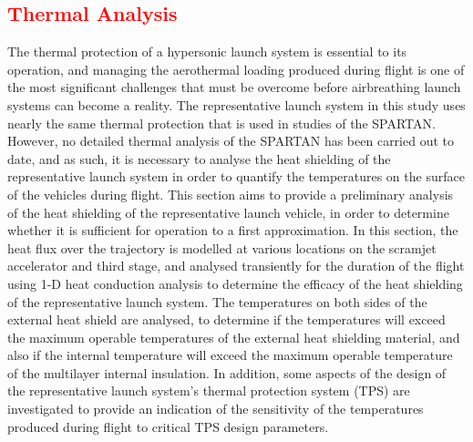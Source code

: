 
\textcolor{red}{
	\chapter{Thermal Analysis}\label{sec:therm}
}


The thermal protection of a hypersonic launch system is essential to its operation, and managing the aerothermal loading produced during flight is one of the most significant challenges that must be overcome before airbreathing launch systems can become a reality. The representative launch system in this study uses nearly the same thermal protection that is used in studies of the SPARTAN\cite{Preller2018a}. However, no detailed thermal analysis of the SPARTAN has been carried out to date, and as such, it is necessary to analyse the heat shielding of the representative launch system in order to quantify the temperatures on the surface of the vehicles during flight. This section aims to provide a preliminary analysis of the heat shielding of the representative launch vehicle, in order to determine whether it is sufficient for operation to a first approximation. In this section, the heat flux over the trajectory is modelled at various locations on the scramjet accelerator and third stage, and analysed transiently for the duration of the flight using 1-D heat conduction analysis to determine the efficacy of the heat shielding of the representative launch system. The temperatures on both sides of the external heat shield are analysed, to determine if the temperatures will exceed the maximum operable temperatures of the external heat shielding material, and also if the internal temperature will exceed the maximum operable temperature of the multilayer internal insulation. In addition, some aspects of the design of the representative launch system's thermal protection system (TPS) are investigated to provide an indication of the sensitivity of the temperatures produced during flight to critical TPS design parameters. 





